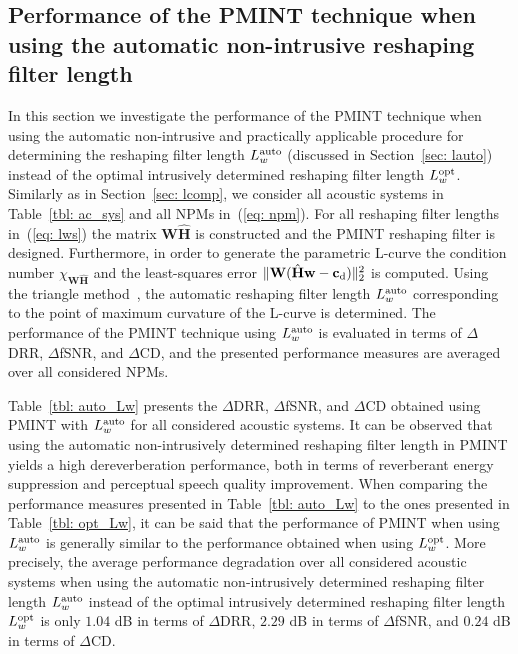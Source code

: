 \documentclass[twocolumn]{bmcart}%
\begin{document}
\subsection{Performance of the PMINT technique when using the automatic non-intrusive reshaping filter length}
\label{sec: filt_auto}
In this section we investigate the performance of the PMINT technique when using the automatic non-intrusive and practically applicable procedure for determining the reshaping filter length $L^{\rm auto}_w$ (discussed in Section~\ref{sec: lauto}) instead of the optimal intrusively determined reshaping filter length $L^{\rm opt}_w$.
Similarly as in Section~\ref{sec: lcomp}, we consider all acoustic systems in Table~\ref{tbl: ac_sys} and all NPMs in~(\ref{eq: npm}).
For all reshaping filter lengths in~(\ref{eq: lws}) the matrix $\mathbf{W}\hat{\mathbf{H}}$ is constructed and the PMINT reshaping filter is designed.
Furthermore, in order to generate the parametric L-curve the condition number $\chi_{\mathbf{W}\hat{\mathbf{H}}}$ and the least-squares error $\|\mathbf{W}(\hat{\mathbf{H}}\mathbf{w}-\mathbf{c}_{\rm d}) \|^2_2$ is computed. 
Using the triangle method~\cite{Castellanos_2002}, the automatic reshaping filter length $L^{\rm auto}_w$ corresponding to the point of maximum curvature of the L-curve is determined.
The performance of the PMINT technique using $L^{\rm auto}_w$ is evaluated in terms of $\Delta$DRR, $\Delta$fSNR, and $\Delta$CD, and the presented performance measures are averaged over all considered NPMs.

Table~\ref{tbl: auto_Lw} presents the $\Delta$DRR, $\Delta$fSNR, and $\Delta$CD obtained using PMINT with $L^{\rm auto}_w$ for all considered acoustic systems.
It can be observed that using the automatic non-intrusively determined reshaping filter length in PMINT yields a high dereverberation performance, both in terms of reverberant energy suppression and perceptual speech quality improvement.
When comparing the performance measures presented in Table~\ref{tbl: auto_Lw} to the ones presented in Table~\ref{tbl: opt_Lw}, it can be said that the performance of PMINT when using $L^{\rm auto}_w$ is generally similar to the performance obtained when using $L^{\rm opt}_w$.
More precisely, the average performance degradation over all considered acoustic systems when using the automatic non-intrusively determined reshaping filter length $L^{\rm auto}_w$ instead of the optimal intrusively determined reshaping filter length $L^{\rm opt}_w$ is only $1.04$ dB in terms of $\Delta$DRR, $2.29$ dB in terms of $\Delta$fSNR, and $0.24$ dB in terms of $\Delta$CD.
\end{document}
